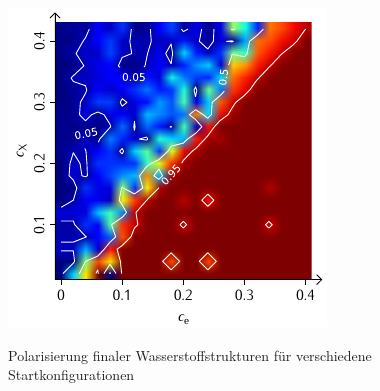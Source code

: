 \documentclass[a4paper, 10pt, twoside, openany]{book} %
\begin{document}
\begin{figure}
\begin{minipage}[t]{0.48\textwidth}
			\label{H_individual_P}
		\end{minipage}
		\hfill
		\begin{minipage}[t]{0.48\textwidth}
			\includegraphics[width=\textwidth]{Abbildungen/Phasendiagramme/Konturen/H_penalty_individual_P.pdf}
			\label{H_penalty_individual_P}
		\end{minipage}
		\caption[Polarisierung finaler Wasserstoffstrukturen]{Polarisierung finaler Wasserstoffstrukturen für verschiedene Startkonfigurationen}
		\label{H_P}
	\end{figure}
	
\end{document}
